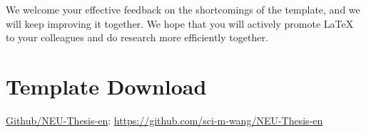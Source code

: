 We welcome your effective feedback on the shortcomings of the template, and we will keep improving it together. We hope that you will actively promote \LaTeX{} to your colleagues and do research more efficiently together.

\section{Template Download}

\begin{center}
    \href{https://github.com/sci-m-wang/NEU-Thesis-en}{Github/NEU-Thesis-en}: \url{https://github.com/sci-m-wang/NEU-Thesis-en}
\end{center}

